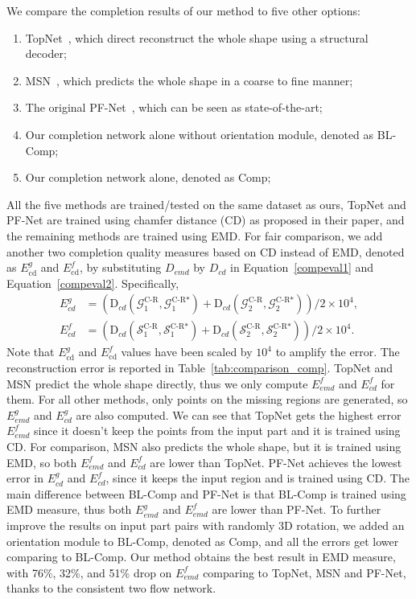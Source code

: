 We compare the completion results of our method to five other options:
\begin{enumerate}
    \item TopNet~\cite{tchapmi2019topnet}, which direct reconstruct the whole shape using a structural decoder;
    \item MSN~\cite{liu2020morphing}, which predicts the whole shape in a coarse to fine manner;
    \item The original PF-Net~\cite{huang2020pf}, which can be seen as state-of-the-art; %
	\item Our completion network alone without orientation module, denoted as BL-Comp;
	\item Our completion network alone, denoted as Comp;
\end{enumerate}

All the five methods are trained/tested on the same dataset as ours, TopNet and PF-Net are trained using chamfer distance (CD) as proposed in their paper, and the remaining methods are trained using EMD. For fair comparison, we add another two completion quality measures based on CD instead of EMD, denoted as $E_{\text{cd}}^g$ and $E_{\text{cd}}^f$, by substituting $D_{emd}$ by $D_{cd}$ in Equation~\ref{compeval1} and Equation~\ref{compeval2}. Specifically,
\begin{align}
E_{cd}^g &= \left(\text{D}_{cd}(\mathcal{G}_{1}^{\text{C-R}}, \mathcal{G}_{1}^{\text{C-R}*}) + \text{D}_{cd}(\mathcal{G}_{2}^{\text{C-R}}, \mathcal{G}_{2}^{\text{C-R}*})\right) / 2 \times 10^4, \\
E_{cd}^f &= \left(\text{D}_{cd}(\mathcal{S}_{1}^{\text{C-R}} , \mathcal{S}_{1}^{\text{C-R}*} ) + \text{D}_{cd}(\mathcal{S}_{2}^{\text{C-R}} , \mathcal{S}_{2}^{\text{C-R}*})\right) / 2 \times 10^4. 
\end{align}
Note that $E_{\text{cd}}^g$ and $E_{\text{cd}}^f$ values have been scaled by $10^4$ to amplify the error.
The reconstruction error is reported in Table~\ref{tab:comparison_comp}.
TopNet and MSN predict the whole shape directly, thus we only compute $E_{emd}^f$ and $E_{cd}^f$ for them. For all other methods, only points on the missing regions are generated, so $E_{emd}^g$ and $E_{cd}^g$ are also computed. 
We can see that TopNet gets the highest error $E_{emd}^f$ since it doesn't keep the points from the input part and it is trained using CD. 
For comparison, MSN also predicts the whole shape, but it is trained using EMD, so both $E_{emd}^f$ and $E_{cd}^f$ are lower than TopNet. 
PF-Net achieves the lowest error in $E_{cd}^g$ and $E_{cd}^f$, since it keeps the input region and is trained using CD. 
The main difference between BL-Comp and PF-Net is that BL-Comp is trained using EMD measure, thus both $E_{emd}^g$ and $E_{emd}^f$ are lower than PF-Net.
To further improve the results on input part pairs with randomly 3D rotation, we added an orientation module to BL-Comp, denoted as Comp, and all the errors get lower comparing to BL-Comp. %
Our method obtains the best result in EMD measure, with 76\%, 32\%, and 51\% drop on $E_{emd}^f$ comparing to TopNet, MSN and PF-Net, thanks to the consistent two flow network.

